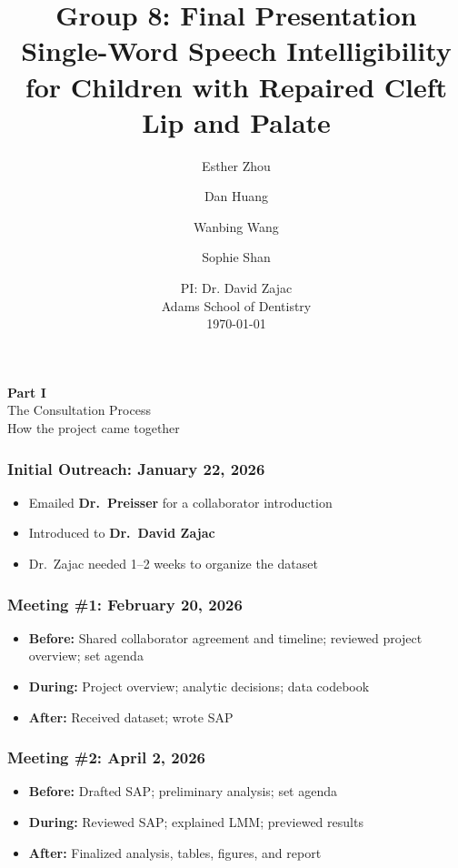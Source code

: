 \documentclass{beamer}
\title{Group 8: Final Presentation\\
       {\normalsize Single-Word Speech Intelligibility for Children with Repaired Cleft Lip and Palate}}
\author{Esther Zhou \and Dan Huang \and Wanbing Wang \and Sophie Shan}
\date{
PI: Dr. David Zajac \\
Adams School of Dentistry \\
\today
}
\begin{document}
\frame{\titlepage}
\begin{frame}
\begin{center}
  {\Large \textbf{\color{blue!60!black} Part I}}\\[1em]
  {\LARGE The Consultation Process}\\[0.5em]
  {\large How the project came together}
\end{center}
\end{frame}
\begin{frame}
\frametitle{Initial Outreach: January 22, 2026}
\begin{itemize}
  \item Emailed \textbf{Dr.\ Preisser} for a collaborator introduction
  \item Introduced to \textbf{Dr.\ David Zajac}
  \item Dr.\ Zajac needed 1--2 weeks to organize the dataset
\end{itemize}
\end{frame}
\begin{frame}
\frametitle{Meeting \#1: February 20, 2026}
\begin{itemize}
  \item \textbf{Before:} Shared collaborator agreement and timeline; reviewed project overview; set agenda
  \item \textbf{During:} Project overview; analytic decisions; data codebook
  \item \textbf{After:} Received dataset; wrote SAP
\end{itemize}
\end{frame}
\begin{frame}
\frametitle{Meeting \#2: April 2, 2026}
\begin{itemize}
  \item \textbf{Before:} Drafted SAP; preliminary analysis; set agenda
  \item \textbf{During:} Reviewed SAP; explained LMM; previewed results
  \item \textbf{After:} Finalized analysis, tables, figures, and report
\end{itemize}
\end{frame}
\end{document}

